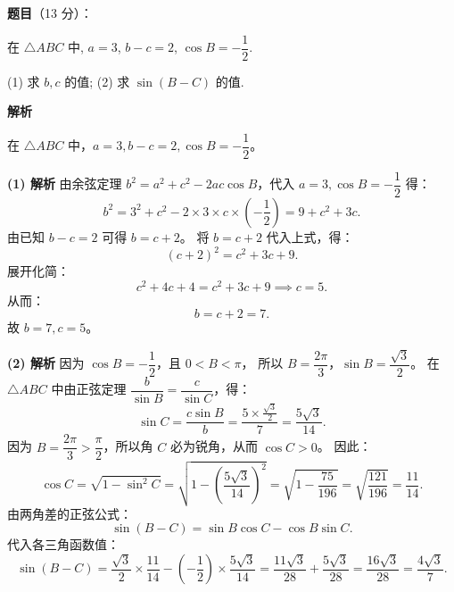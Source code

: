 \begin{answer}

\textbf{题目}（13 分）：

在 $\triangle ABC$ 中, $a = 3$, $b - c = 2$, $\cos B = -\dfrac{1}{2}$.

(1) 求 $b, c$ 的值;  
(2) 求 $\sin (B - C)$ 的值.

\textbf{解析}

在 $\triangle ABC$ 中，$a = 3, b - c = 2, \cos B = -\dfrac{1}{2}$。

\textbf{(1) 解析}
由余弦定理 $b^2 = a^2 + c^2 - 2ac\cos B$，代入 $a = 3, \cos B = -\dfrac{1}{2}$ 得：
\nopagebreak[4]
\[b^2 = 3^2 + c^2 - 2 \times 3 \times c \times \left(-\frac{1}{2}\right) = 9 + c^2 + 3c.\]
由已知 $b - c = 2$ 可得 $b = c + 2$。
将 $b = c + 2$ 代入上式，得：
\nopagebreak[4]
\[(c + 2)^2 = c^2 + 3c + 9.\]
展开化简：
\nopagebreak[4]
\[c^2 + 4c + 4 = c^2 + 3c + 9 \implies c = 5.\]
从而：
\nopagebreak[4]
\[b = c + 2 = 7.\]
故 $b = 7, c = 5$。

\textbf{(2) 解析}
因为 $\cos B = -\dfrac{1}{2}$，且 $0 < B < \pi$，
所以 $B = \dfrac{2\pi}{3}$，$\sin B = \dfrac{\sqrt{3}}{2}$。
在 $\triangle ABC$ 中由正弦定理 $\dfrac{b}{\sin B} = \dfrac{c}{\sin C}$，得：
\nopagebreak[4]
\[\sin C = \frac{c\sin B}{b} = \frac{5 \times \frac{\sqrt{3}}{2}}{7} = \frac{5\sqrt{3}}{14}.\]
因为 $B = \dfrac{2\pi}{3} > \dfrac{\pi}{2}$，所以角 $C$ 必为锐角，从而 $\cos C > 0$。
因此：
\nopagebreak[4]
\[\cos C = \sqrt{1 - \sin^2 C} = \sqrt{1 - \left(\frac{5\sqrt{3}}{14}\right)^2} = \sqrt{1 - \frac{75}{196}} = \sqrt{\frac{121}{196}} = \frac{11}{14}.\]
由两角差的正弦公式：
\nopagebreak[4]
\[\sin(B - C) = \sin B\cos C - \cos B\sin C.\]
代入各三角函数值：
\nopagebreak[4]
\[\sin(B - C) = \frac{\sqrt{3}}{2} \times \frac{11}{14} - \left(-\frac{1}{2}\right) \times \frac{5\sqrt{3}}{14} = \frac{11\sqrt{3}}{28} + \frac{5\sqrt{3}}{28} = \frac{16\sqrt{3}}{28} = \frac{4\sqrt{3}}{7}.\]



\end{answer}
